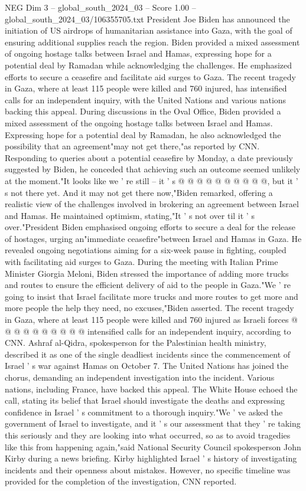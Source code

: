 \begin{textsample}{NEG Dim 3 – global\_south\_2024\_03 – Score 1.00 – global\_south\_2024\_03/106355705.txt}  \label{ex:f3_neg_033}
President Joe Biden has announced the initiation of US airdrops of humanitarian assistance into Gaza, with the goal of ensuring additional supplies reach the region.
Biden provided a mixed assessment of ongoing hostage talks between Israel and Hamas, expressing hope for a potential deal by Ramadan while acknowledging the challenges.
He emphasized efforts to secure a ceasefire and facilitate aid surges to Gaza.
The recent tragedy in Gaza, where at least 115 people were killed and 760 injured, has intensified calls for an independent inquiry, with the United Nations and various nations backing this appeal.
During discussions in the Oval Office, Biden provided a mixed assessment of the ongoing hostage talks between Israel and Hamas.
Expressing hope for a potential deal by Ramadan, he also acknowledged the possibility that an agreement"may not get there,"as reported by CNN.
Responding to queries about a potential ceasefire by Monday, a date previously suggested by Biden, he conceded that achieving such an outcome seemed unlikely at the moment."It looks like we ' re still -- it ' s @ @ @ @ @ @ @ @ @ @, but it ' s not there yet.
And it may not get there now,"Biden remarked, offering a realistic view of the challenges involved in brokering an agreement between Israel and Hamas.
He maintained optimism, stating,"It ' s not over til it ' s over."President Biden emphasised ongoing efforts to secure a deal for the release of hostages, urging an"immediate ceasefire"between Israel and Hamas in Gaza.
He revealed ongoing negotiations aiming for a six-week pause in fighting, coupled with facilitating aid surges to Gaza.
During the meeting with Italian Prime Minister Giorgia Meloni, Biden stressed the importance of adding more trucks and routes to ensure the efficient delivery of aid to the people in Gaza."We ' re going to insist that Israel facilitate more trucks and more routes to get more and more people the help they need, no excuses,"Biden asserted.
The recent tragedy in Gaza, where at least 115 people were killed and 760 injured as Israeli forces @ @ @ @ @ @ @ @ @ @ intensified calls for an independent inquiry, according to CNN.
Ashraf al-Qidra, spokesperson for the Palestinian health ministry, described it as one of the single deadliest incidents since the commencement of Israel ' s war against Hamas on October 7.
The United Nations has joined the chorus, demanding an independent investigation into the incident.
Various nations, including France, have backed this appeal.
The White House echoed the call, stating its belief that Israel should investigate the deaths and expressing confidence in Israel ' s commitment to a thorough inquiry."We ' ve asked the government of Israel to investigate, and it ' s our assessment that they ' re taking this seriously and they are looking into what occurred, so as to avoid tragedies like this from happening again,"said National Security Council spokesperson John Kirby during a news briefing.
Kirby highlighted Israel ' s history of investigating incidents and their openness about mistakes.
However, no specific timeline was provided for the completion of the investigation, CNN reported.

\end{textsample}
